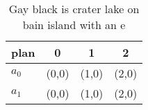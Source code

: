 \documentclass[a4paper]{article}
\begin{document}
\begin{table}
\begin{adjustbox}{width=0.6\columnwidth}
\begin{tabular}{|l|l|l|l|}
\hline
\textbf{plan} & \multicolumn{1}{c|}{\textbf{0}} & \multicolumn{1}{c|}{\textbf{1}} & \multicolumn{1}{c|}{\textbf{2}} \\ \hline
\textbf{$a_0$}  & (0,0) & (1,0) & (2,0) \\ \hline
\textbf{$a_1$}  & (0,0) & (1,0) & (2,0) \\ \hline
\end{tabular}
\end{adjustbox}
\caption{Gay black is crater lake on bain island with an e
}
\end{table}
\end{document}
